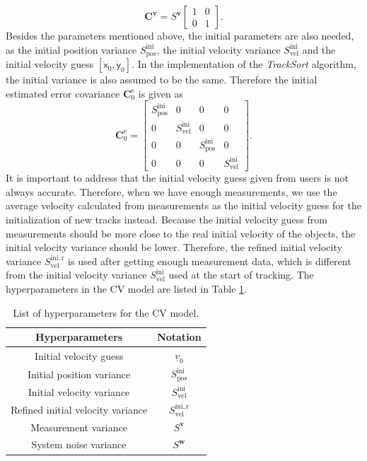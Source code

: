 \begin{equation}
    \mathbf{C}^{\underline{\boldsymbol{v}}}= S^{\boldsymbol{v}}
    \begin{bmatrix}
     1 & 0 \\ 
     0 & 1
    \end{bmatrix} .
\end{equation}
Besides the parameters mentioned above, the initial parameters are also needed, as the initial position variance $S_{\mathrm{pos}}^{\mathrm{ini}}$, the initial velocity variance $S_{\mathrm{vel}}^{\mathrm{ini}}$ and the initial velocity guess $[\dot{\mathsf{x}}_{0}, \dot{\mathsf{y}}_{0}]$. In the implementation of  the \textit{TrackSort} algorithm, the initial variance is also assumed to be the same.  Therefore the initial estimated error covariance $\mathbf{C}_{0}^{\mathrm{e}}$ is given as
\begin{equation}
    \mathbf{C}^{\mathrm{e}}_{0}=
    \begin{bmatrix}
     S_{\mathrm{pos}}^{\mathrm{ini}} & 0 & 0 & 0 \\ 
     0 & S_{\mathrm{vel}}^{\mathrm{ini}} & 0 & 0 \\ 
     0 & 0 & S_{\mathrm{pos}}^{\mathrm{ini}} & 0 \\ 
     0 & 0 & 0 & S_{\mathrm{vel}}^{\mathrm{ini}}
    \end{bmatrix} .
\end{equation}
It is important to address that the initial velocity guess given from users is not always accurate. Therefore, when we have enough measurements, we use the average velocity calculated from measurements as the initial velocity guess for the initialization of new tracks instead. Because the initial velocity guess from measurements should be more close to the real initial velocity of the objects, the initial velocity variance should be lower. Therefore, the refined initial velocity variance $S_{\mathrm{vel}}^{\mathrm{ini, r}}$ is used after getting enough measurement data, which is different from the initial velocity variance $S_{\mathrm{vel}}^{\mathrm{ini}}$ used at the start of tracking. The hyperparameters in the CV model are listed in Table \ref{list hp cv}.
\begin{table}[htbp] 
    \centering
    \caption{List of hyperparameters for the CV model.} 
    \begin{tabular}{cc} 
    \toprule 
    Hyperparameters&Notation\\ 
    \midrule 
    Initial velocity guess              &$\underline{v}_{0}$\\
    Initial position variance           &$S_{\mathrm{pos}}^{\mathrm{ini}}$\\
    Initial velocity variance           &$S_{\mathrm{vel}}^{\mathrm{ini}}$\\
    Refined initial velocity variance   &$S_{\mathrm{vel}}^{\mathrm{ini, r}}$\\
    Measurement variance                &$S^{\boldsymbol{v}}$\\
    System noise variance               &$S^{\boldsymbol{w}}$\\ 
    \bottomrule 
    \end{tabular} 
    \label{list hp cv}
\end{table}

